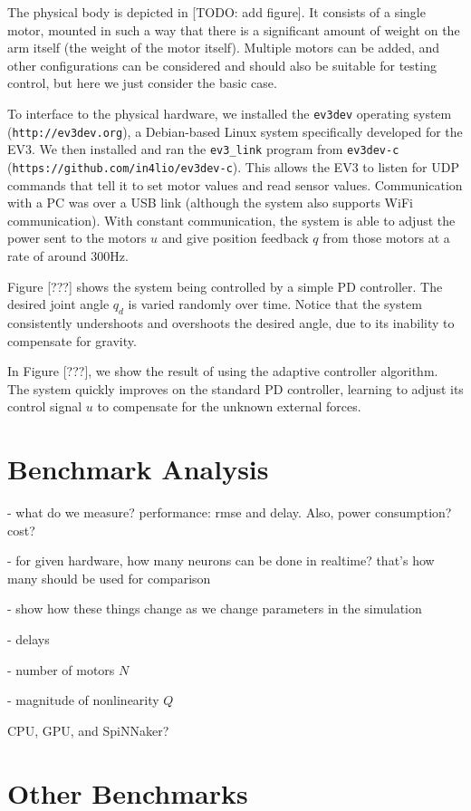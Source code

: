 \documentclass{frontiersSCNS} %
\begin{document}
The physical body is depicted in [TODO: add figure].  It consists of a single
motor, mounted in such a way that there is a significant amount of weight on
the arm itself (the weight of the motor itself).  Multiple motors can be
added, and other configurations can be considered and should also be suitable
for testing control, but here we just consider the basic case.

To interface to the physical hardware, we installed the \texttt{ev3dev} operating
system (\texttt{http://ev3dev.org}), a Debian-based Linux system specifically developed
for the EV3.  We then installed and ran the \texttt{ev3\_link} program from \texttt{ev3dev-c}
(\texttt{https://github.com/in4lio/ev3dev-c}).  This allows the EV3 to listen for
UDP commands that tell it to set motor values and read sensor values.
Communication with a PC was over a USB link (although the system also
supports WiFi communication).  With constant communication, the system is
able to adjust the power sent to the motors $u$ and give position feedback
$q$ from those motors at a rate of around 300Hz.

Figure [???] shows the system being controlled by a simple PD controller.
The desired joint angle $q_d$ is varied randomly over time.  Notice that the
system consistently undershoots and overshoots the desired angle, due to
its inability to compensate for gravity.

In Figure [???], we show the result of using the adaptive controller algorithm.
The system quickly improves on the standard PD controller, learning to adjust
its control signal $u$ to compensate for the unknown external forces.

\section{Benchmark Analysis}

- what do we measure?   performance: rmse and delay.  Also, power consumption?  cost?

- for given hardware, how many neurons can be done in realtime?  that's how many should be used for comparison

- show how these things change as we change parameters in the simulation

- delays

- number of motors $N$

- magnitude of nonlinearity $Q$

CPU, GPU, and SpiNNaker?

\section{Other Benchmarks}
\end{document}
